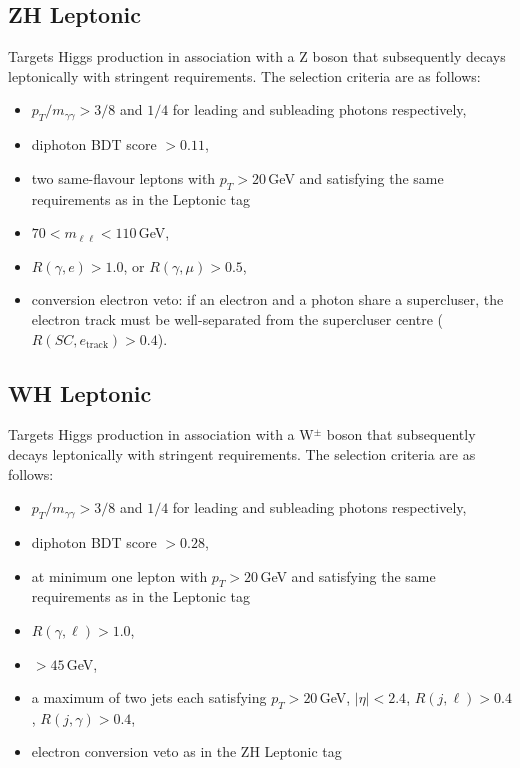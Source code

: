 \subsection{ZH Leptonic}
Targets Higgs production in association with a Z boson that subsequently decays leptonically with stringent requirements. The selection criteria are as follows:
\begin{itemize}[leftmargin=.5in,noitemsep]
    \item $p_{T}/m_{\gamma\gamma} > 3/8$ and $1/4$ for leading and subleading photons respectively,
    \item diphoton BDT score $> 0.11$,
    \item two same-flavour leptons with $p_T > 20$\,GeV and satisfying the same requirements as in the \ttH Leptonic tag
    \item $70 < m_{\ell\ell} < 110$\,GeV,
    \item $R(\gamma,e) > 1.0$, or $R(\gamma,\mu) > 0.5$,
    \item conversion electron veto: if an electron and a photon share a supercluser, the electron track must be well-separated from the supercluser centre ($R(SC,e_{\mathrm{track}}) > 0.4$).
\end{itemize}


\subsection{WH Leptonic}
Targets Higgs production in association with a W$^{\pm}$ boson that subsequently decays leptonically with stringent requirements. The selection criteria are as follows:
\begin{itemize}[leftmargin=.5in,noitemsep]
    \item $p_{T}/m_{\gamma\gamma} > 3/8$ and $1/4$ for leading and subleading photons respectively,
    \item diphoton BDT score $> 0.28$,
    \item at minimum one lepton with $p_T > 20$\,GeV and satisfying the same requirements as in the \ttH Leptonic tag
    \item $R(\gamma,\ell) > 1.0$,
    \item \MET$> 45$\,GeV,
    \item a maximum of two jets each satisfying $p_T > 20$\,GeV, $|\eta| < 2.4$, $R(j,\ell) > 0.4$, $R(j,\gamma) > 0.4$,
    \item electron conversion veto as in the ZH Leptonic tag
\end{itemize}



